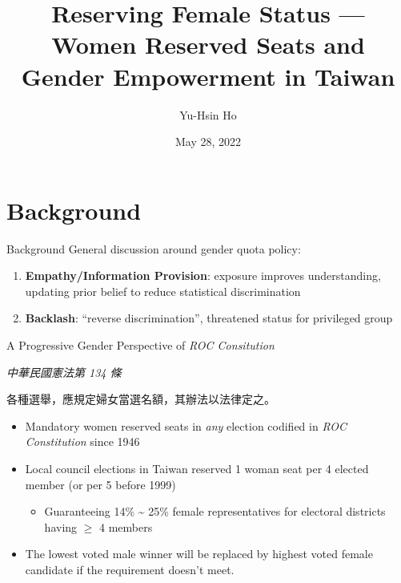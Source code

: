 \documentclass[
  10pt,
  ignorenonframetext,
  aspectratio=43,
]{beamer}
\title{Reserving Female Status --- Women Reserved Seats and Gender
Empowerment in Taiwan}
\author{Yu-Hsin Ho}
\date{May 28, 2022}
\institute{Department of Economics, National Taiwan University}
\providecommand{\tightlist}{%
  \setlength{\itemsep}{0pt}\setlength{\parskip}{0pt}}
\renewenvironment{quote}{\begin{customblockquote}\list{}{\rightmargin=0em\leftmargin=0em}%
\item\relax\color{blockquote-text}\ignorespaces}{\unskip\unskip\endlist\end{customblockquote}}
\begin{document}
\frame{\titlepage}

\hypertarget{background}{%
\section{Background}\label{background}}

\begin{frame}{Background}
General discussion around gender quota policy:

\begin{enumerate}
\tightlist
\item
  \textbf{Empathy/Information Provision}: exposure improves
  understanding, updating prior belief to reduce statistical
  discrimination
\item
  \textbf{Backlash}: ``reverse discrimination'', threatened status for
  privileged group
\end{enumerate}
\end{frame}

\begin{frame}{A Progressive Gender Perspective of \emph{ROC
Consitution}}
\protect\hypertarget{a-progressive-gender-perspective-of-roc-consitution}{}
\begin{quote}
\emph{中華民國憲法第 134 條}

各種選舉，應規定婦女當選名額，其辦法以法律定之。
\end{quote}

\begin{itemize}
\tightlist
\item
  Mandatory women reserved seats in \emph{any} election codified in
  \emph{ROC Constitution} since 1946
\item
  Local council elections in Taiwan reserved 1 woman seat per 4 elected
  member (or per 5 before 1999)

  \begin{itemize}
  \tightlist
  \item
    Guaranteeing 14\% \textasciitilde{} 25\% female representatives for
    electoral districts having \(\geq\) 4 members
  \end{itemize}
\item
  The lowest voted male winner will be replaced by highest voted female
  candidate if the requirement doesn't meet.
\end{itemize}
\end{frame}
\end{document}
